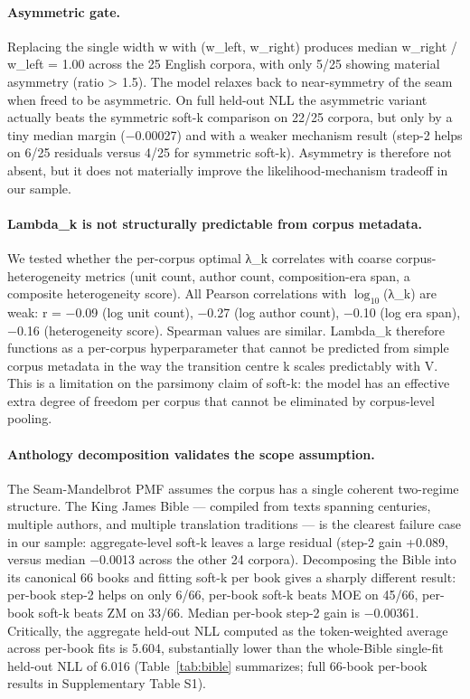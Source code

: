 \documentclass[11pt]{article}
\begin{document}
\paragraph{Asymmetric gate.} Replacing the single width w with (w\_left, w\_right) produces median w\_right / w\_left = 1.00 across the 25 English corpora, with only 5/25 showing material asymmetry (ratio > 1.5). The model relaxes back to near-symmetry of the seam when freed to be asymmetric. On full held-out NLL the asymmetric variant actually beats the symmetric soft-k comparison on 22/25 corpora, but only by a tiny median margin (−0.00027) and with a weaker mechanism result (step-2 helps on 6/25 residuals versus 4/25 for symmetric soft-k). Asymmetry is therefore not absent, but it does not materially improve the likelihood-mechanism tradeoff in our sample.

\paragraph{Lambda\_k is not structurally predictable from corpus metadata.} We tested whether the per-corpus optimal λ\_k correlates with coarse corpus-heterogeneity metrics (unit count, author count, composition-era span, a composite heterogeneity score). All Pearson correlations with $\log_{10}$(λ\_k) are weak: r = −0.09 (log unit count), −0.27 (log author count), −0.10 (log era span), −0.16 (heterogeneity score). Spearman values are similar. Lambda\_k therefore functions as a per-corpus hyperparameter that cannot be predicted from simple corpus metadata in the way the transition centre k scales predictably with V. This is a limitation on the parsimony claim of soft-k: the model has an effective extra degree of freedom per corpus that cannot be eliminated by corpus-level pooling.

\paragraph{Anthology decomposition validates the scope assumption.} The Seam-Mandelbrot PMF assumes the corpus has a single coherent two-regime structure. The King James Bible — compiled from texts spanning centuries, multiple authors, and multiple translation traditions — is the clearest failure case in our sample: aggregate-level soft-k leaves a large residual (step-2 gain +0.089, versus median −0.0013 across the other 24 corpora). Decomposing the Bible into its canonical 66 books and fitting soft-k per book gives a sharply different result: per-book step-2 helps on only 6/66, per-book soft-k beats MOE on 45/66, per-book soft-k beats ZM on 33/66. Median per-book step-2 gain is −0.00361. Critically, the aggregate held-out NLL computed as the token-weighted average across per-book fits is 5.604, substantially lower than the whole-Bible single-fit held-out NLL of 6.016 (Table~\ref{tab:bible} summarizes; full 66-book per-book results in Supplementary Table S1).
\end{document}
